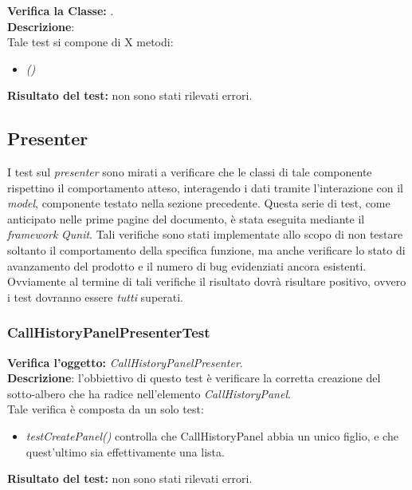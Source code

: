 \subsubsection{}
\textbf{Verifica la Classe:} \textit{}.\\
\textbf{Descrizione}:\\
Tale test si compone di X metodi:
\begin{itemize}
\item \textit{() }
\end{itemize}
\textbf{Risultato del test:} non sono stati rilevati errori.


\subsection{Presenter}
I test sul \textit{presenter} sono mirati a verificare che le classi di tale componente rispettino il comportamento atteso, interagendo i dati tramite l'interazione con il \textit{model}, componente testato nella sezione precedente. Questa serie di test, come anticipato nelle prime pagine del documento, è stata eseguita mediante il \textit{framework} \textit{Qunit}. Tali verifiche sono stati implementate allo scopo di non testare soltanto il comportamento della specifica funzione, ma anche verificare lo stato di avanzamento del prodotto e il numero di bug evidenziati ancora esistenti.
Ovviamente al termine di tali verifiche il risultato dovrà risultare positivo, ovvero i test dovranno essere \textit{tutti} superati.

\subsubsection{CallHistoryPanelPresenterTest}
\textbf{Verifica l'oggetto:} \textit{CallHistoryPanelPresenter}.\\
\textbf{Descrizione}: l'obbiettivo di questo test è verificare la corretta creazione del sotto-albero che ha radice nell'elemento \textit{CallHistoryPanel}.\\
Tale verifica è composta da un solo test:
\begin{itemize}
\item \textit{testCreatePanel() } controlla che CallHistoryPanel abbia un unico figlio, e che quest'ultimo sia effettivamente una lista.
\end{itemize}
\textbf{Risultato del test:} non sono stati rilevati errori.


